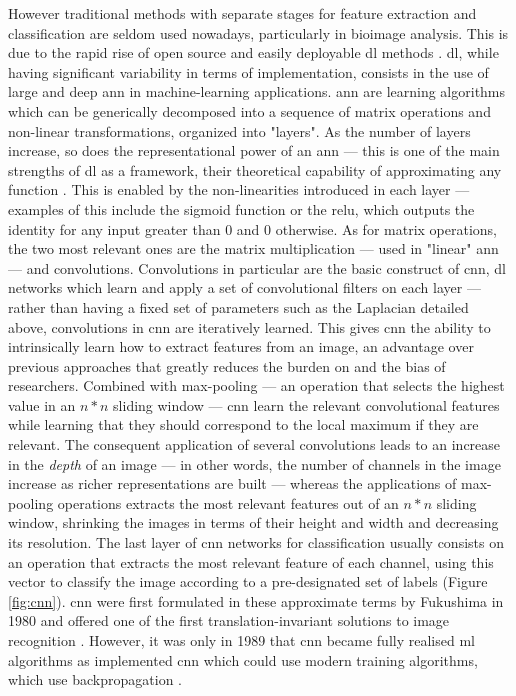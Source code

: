 However traditional methods with separate stages for feature extraction and classification are seldom used nowadays, particularly in bioimage analysis. This is due to the rapid rise of open source and easily deployable \ac{dl} methods \cite{Lucas2021-hc}. \Ac{dl}, while having significant variability in terms of implementation, consists in the use of large and deep \ac{ann} in machine-learning applications. \Ac{ann} are learning algorithms which can be generically decomposed into a sequence of matrix operations and non-linear transformations, organized into "layers". As the number of layers increase, so does the representational power of an \ac{ann} --- this is one of the main strengths of \ac{dl} as a framework, their theoretical capability of approximating any function \cite{Nielsen2015-wn}. This is enabled by the non-linearities introduced in each layer --- examples of this include the sigmoid function or the \ac{relu}, which outputs the identity for any input greater than $0$ and $0$ otherwise. As for matrix operations, the two most relevant ones are the matrix multiplication --- used in "linear" \ac{ann} --- and convolutions. Convolutions in particular are the basic construct of \ac{cnn}, \ac{dl} networks which learn and apply a set of convolutional filters on each layer --- rather than having a fixed set of parameters such as the Laplacian detailed above, convolutions in \ac{cnn} are iteratively learned. This gives \ac{cnn} the ability to intrinsically learn how to extract features from an image, an advantage over previous approaches that greatly reduces the burden on and the bias of researchers. Combined with max-pooling --- an operation that selects the highest value in an $n*n$ sliding window --- \ac{cnn} learn the relevant convolutional features while learning that they should correspond to the local maximum if they are relevant. The consequent application of several convolutions leads to an increase in the \textit{depth} of an image --- in other words, the number of channels in the image increase as richer representations are built --- whereas the applications of max-pooling operations extracts the most relevant features out of an $n*n$ sliding window, shrinking the images in terms of their height and width and decreasing its resolution. The last layer of \ac{cnn} networks for classification usually consists on an operation that extracts the most relevant feature of each channel, using this vector to classify the image according to a pre-designated set of labels (Figure \ref{fig:cnn}). \ac{cnn} were first formulated in these approximate terms by Fukushima in 1980 and offered one of the first translation-invariant solutions to image recognition \cite{Fukushima1980-bk}. However, it was only in 1989 that \ac{cnn} became fully realised \ac{ml} algorithms as  implemented \ac{cnn} which could use modern training algorithms, which use backpropagation \cite{LeCun1989-ro}. 

